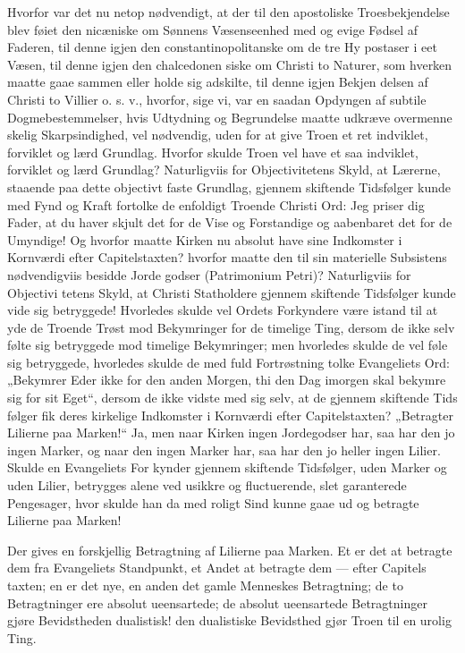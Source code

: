 \documentclass[12pt]{book}
\newcommand{\opage}[1]{\marginnote{\footnotesize\textit{[#1]}}}
\begin{document}
Hvorfor var det nu netop nødvendigt, at der til den
apostoliske Troesbekjendelse blev føiet den nicæniske om
Sønnens Væsenseenhed med og evige Fødsel af Faderen,
til denne igjen den constantinopolitanske om de tre Hy\-%
postaser i eet Væsen, til denne igjen den chalcedonen\-%
siske om Christi to Naturer, som hverken maatte gaae
sammen eller holde sig adskilte, til denne igjen Bekjen\-%
delsen af Christi to Villier o. s. v., hvorfor, sige vi, var
en saadan Opdyngen af subtile Dogmebestemmelser, hvis
Udtydning og Begrundelse maatte udkræve overmenne\-%
skelig Skarpsindighed, vel nødvendig, uden for at give
Troen et ret indviklet, forviklet og lærd Grundlag.
Hvorfor skulde Troen vel have et saa indviklet, forviklet
og lærd Grundlag? Naturligviis for Objectivitetens Skyld,
at Lærerne, staaende paa dette objectivt faste Grundlag,
gjennem skiftende Tidsfølger kunde med Fynd og
Kraft fortolke de enfoldigt Troende Christi Ord: Jeg
priser dig Fader, at du haver skjult det for de Vise og
Forstandige og aabenbaret det for de Umyndige! Og
hvorfor maatte Kirken nu absolut have sine Indkomster
i Kornværdi efter Capitelstaxten? hvorfor maatte den
\opage{261}\setcounter{footnote}{0}%
til sin materielle Subsistens nødvendigviis besidde Jorde\-%
godser (Patrimonium Petri)? Naturligviis for Objectivi\-%
tetens Skyld, at Christi Statholdere gjennem skiftende
Tidsfølger kunde vide sig betryggede! Hvorledes skulde
vel Ordets Forkyndere være istand til at yde de Troende
Trøst mod Bekymringer for de timelige Ting, dersom de ikke
selv følte sig betryggede mod timelige Bekymringer; men
hvorledes skulde de vel føle sig betryggede, hvorledes
skulde de med fuld Fortrøstning tolke Evangeliets Ord:
„Bekymrer Eder ikke for den anden Morgen, thi den
Dag imorgen skal bekymre sig for sit Eget“, dersom de
ikke vidste med sig selv, at de gjennem skiftende Tids\-%
følger fik deres kirkelige Indkomster i Kornværdi efter
Capitelstaxten? „Betragter Lilierne paa Marken!“ Ja,
men naar Kirken ingen Jordegodser har, saa har den jo
ingen Marker, og naar den ingen Marker har, saa har
den jo heller ingen Lilier. Skulde en Evangeliets For\-%
kynder gjennem skiftende Tidsfølger, uden Marker og
uden Lilier, betrygges alene ved usikkre og fluctuerende,
slet garanterede Pengesager, hvor skulde han da med
roligt Sind kunne gaae ud og betragte Lilierne paa
Marken!

Der gives en forskjellig Betragtning af Lilierne paa
Marken. Et er det at betragte dem fra Evangeliets
Standpunkt, et Andet at betragte dem --- efter Capitels\-%
taxten; en er det nye, en anden det gamle Menneskes
Betragtning; de to Betragtninger ere absolut ueensartede;
de absolut ueensartede Betragtninger gjøre Bevidstheden
dualistisk! den dualistiske Bevidsthed gjør Troen til en
urolig Ting.
\end{document}
